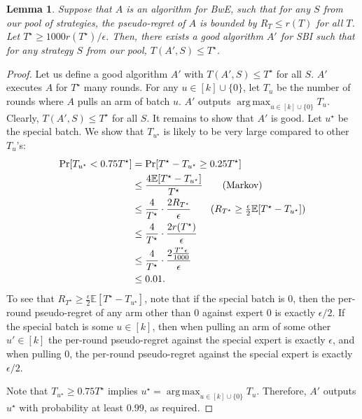 \documentclass[a4paper,11pt]{article}
\newtheorem{lemma}[theorem]{Lemma}
\theoremstyle{definition}
\DeclareMathOperator*{\argmax}{arg\,max}
\begin{document}
\begin{lemma} \label{lem:reduction}
    Suppose that $A$ is an algorithm for BwE, such that for any $S$ from our pool of strategies, the pseudo-regret of $A$ is bounded by $R_T \leq r(T)$ for all $T$. Let $T^\star \geq 1000r(T^\star)/\epsilon$. Then, there exists a good algorithm $A'$ for SBI such that for any strategy $S$ from our pool, $T(A',S) \leq T^\star$.
\end{lemma}

\begin{proof}
    Let us define a good algorithm $A'$ with $T(A',S) \leq T^\star$ for all $S$. $A'$ executes $A$ for $T^\star$ many rounds. For any $u \in [k] \cup\{0\}$, let $T_u$ be the number of rounds where $A$ pulls an arm of batch $u$. $A'$ outputs $\argmax_{u \in [k] \cup \{0\}} T_u$. Clearly, $T(A',S) \leq T^\star$ for all $S$. It remains to show that $A'$ is good. Let $u^\star$ be the special batch. We show that $T_{u^\star}$ is likely to be very large compared to other $T_u$'s:
    \begin{align*}
        \Pr[T_{u^\star} < 0.75 T^\star] &= \Pr[T^\star - T_{u^\star} \geq 0.25T^\star] \\
                                        & \leq \frac{4 \mathbb{E}[T^\star - T_{u^\star}]}{T^\star} \tag{Markov}\\
                                        & \leq \frac{4}{T^\star} \cdot \frac{2 R_{T^\star}}{\epsilon} \tag{$R_{T^\star} \geq \frac{\epsilon}{2} \mathbb{E}[T^\star - T_{u^\star}]$} \\
                                        & \leq \frac{4}{T^\star} \cdot \frac{2 r(T^\star)}{\epsilon} \\
                                        &\leq  \frac{4}{T^\star} \cdot \frac{2 \frac{T^\star \epsilon}{1000}}{\epsilon} \\
                                        &\leq 0.01.
    \end{align*}
    To see that $R_{T^\star} \geq \frac{\epsilon}{2} \mathbb{E}[T^\star - T_{u^\star}]$, note that if the special batch is $0$, then the per-round pseudo-regret of any arm other than $0$ against expert $0$ is exactly $\epsilon/2$. If the special batch is some $u\in [k]$, then when pulling an arm of some other $u' \in [k]$ the per-round pseudo-regret against the special expert is exactly $\epsilon$, and when pulling $0$, the per-round pseudo-regret against the special expert is exactly $\epsilon/2$.

    Note that $T_{u^\star} \geq 0.75 T^\star$ implies $u^\star = \argmax_{u \in [k] \cup \{0\}} T_u$. Therefore, $A'$ outputs $u^\star$ with probability at least $0.99$, as required.
\end{proof}
\end{document}
